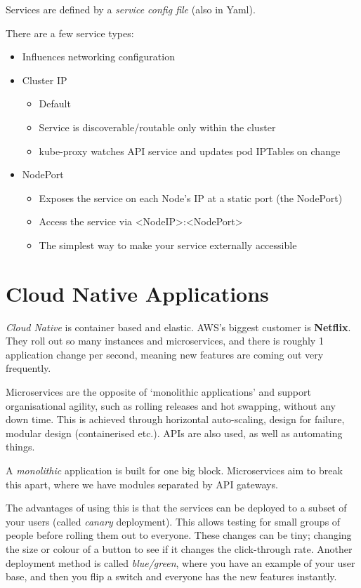 \documentclass[11pt,a4paper,titlepage,dvipsnames,cmyk]{scrartcl}
\begin{document}
Services are defined by a \textit{service config file} (also in Yaml).

There are a few service types:
\begin{itemize}
    \item Influences networking configuration
    \item Cluster IP
    \begin{itemize}
        \item Default
        \item Service is discoverable/routable only within the cluster
        \item kube-proxy watches API service and updates pod IPTables on change
    \end{itemize}
    \item NodePort
    \begin{itemize}
        \item Exposes the service on each Node's IP at a static port (the NodePort)
        \item Access the service via <NodeIP>:<NodePort>
        \item The simplest way to make your service externally accessible
    \end{itemize}
\end{itemize}
\section{Cloud Native Applications}
\textit{Cloud Native} is container based and elastic. AWS's biggest customer is \textbf{Netflix}. They roll out so many instances and microservices, and there is roughly 1 application change per second, meaning new features are coming out very frequently.

Microservices are the opposite of `monolithic applications' and support organisational agility, such as rolling releases and hot swapping, without any down time. This is achieved through horizontal auto-scaling, design for failure, modular design (containerised etc.). APIs are also used, as well as automating things.

A \textit{monolithic} application is built for one big block. Microservices aim to break this apart, where we have modules separated by API gateways.

The advantages of using this is that the services can be deployed to a subset of your users (called \textit{canary} deployment). This allows testing for small groups of people before rolling them out to everyone. These changes can be tiny; changing the size or colour of a button to see if it changes the click-through rate. Another deployment method is called \textit{blue/green}, where you have an example of your user base, and then you flip a switch and everyone has the new features instantly.
\end{document}
